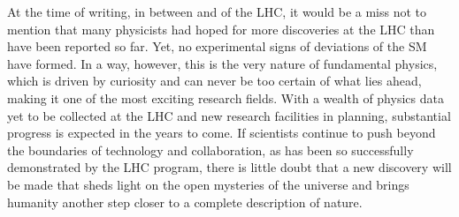 At the time of writing, in between \RunTwo and \RunThr of the LHC, it would be a miss not to mention that many physicists had hoped for more discoveries at the LHC than have been reported so far. 
Yet, no experimental signs of deviations of the SM have formed.
In a way, however, this is the very nature of fundamental physics, which is driven by curiosity and can never be too certain of what lies ahead, making it one of the most exciting research fields. 
With a wealth of physics data yet to be collected at the LHC and new research facilities in planning, substantial progress is expected in the years to come. 
If scientists continue to push beyond the boundaries of technology and collaboration, as has been so successfully demonstrated by the LHC program, there is little doubt that a new discovery will be made that sheds light on the open mysteries of the universe and brings humanity another step closer to a complete description of nature. 




